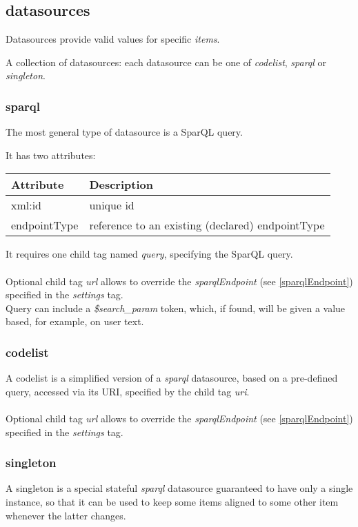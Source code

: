 	\subsection{datasources}
Datasources provide valid values for specific \textit{items}.

A collection of datasources: each datasource can be one of \textit{codelist}, \textit{sparql} or \textit{singleton}.

\subsubsection{sparql}
The most general type of datasource is a SparQL query.

It has two attributes:
\begin{center}
	\begin{tabular}{ | p{} | p{} | }
		\hline
		Attribute & Description \\ 
		\hline
		xml:id & unique id \\  
		\hline
		endpointType & reference to an existing (declared) endpointType \\
		\hline
	\end{tabular}
\end{center}

It requires one child tag named \textit{query}, specifying the SparQL query.
\\
\\
Optional child tag \textit{url} allows to override the \textit{sparqlEndpoint} (see \ref{sparqlEndpoint}) specified in the \textit{settings} tag.
\\
Query can include a \textit{\$search\_param} token, which, if found, will be given a value based, for example, on user text.

\subsubsection{codelist}
A codelist is a simplified version of a \textit{sparql} datasource, based on a pre-defined query, accessed via its URI, specified by the child tag \textit{uri}.
\\
\\
Optional child tag \textit{url} allows to override the \textit{sparqlEndpoint} (see \ref{sparqlEndpoint}) specified in the \textit{settings} tag.
\\

\subsubsection{singleton}
\label{singleton}
A singleton is a special stateful \textit{sparql} datasource guaranteed to have only a single instance, so that it can be used to keep some items aligned to some other item whenever the latter changes.

